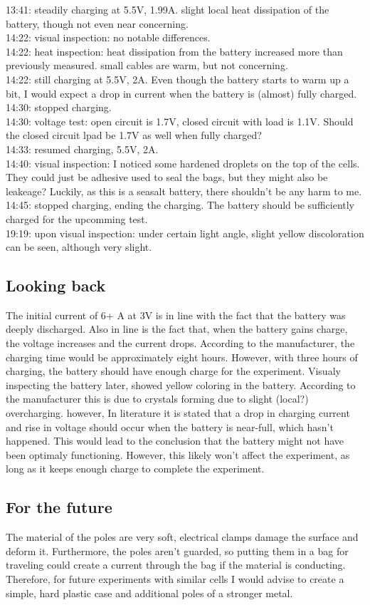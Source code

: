 13:41: steadily charging at 5.5V, 1.99A. slight local heat dissipation of the battery, though not even near concerning.\\
14:22: visual inspection: no notable differences.\\
14:22: heat inspection: heat dissipation from the battery increased more than previously measured. small cables are warm, but not concerning.\\
14:22: still charging at 5.5V, 2A. Even though the battery starts to warm up a bit, I would expect a drop in current when the battery is (almost) fully charged.\\
14:30: stopped charging.\\
14:30: voltage test: open circuit is 1.7V, closed circuit with load is 1.1V. Should the closed circuit lpad be 1.7V as well when fully charged?\\
14:33: resumed charging, 5.5V, 2A.\\
14:40: visual inspection: I noticed some hardened droplets on the top of the cells. They could just be adhesive used to seal the bags, but they might also be leakeage? Luckily, as this is a seasalt battery, there shouldn't be any harm to me.\\
14:45: stopped charging, ending the charging. The battery should be sufficiently charged for the upcomming test. \\
19:19: upon visual inspection: under certain light angle, slight yellow discoloration can be seen, although very slight. 


\subsection{Looking back}
The initial current of 6+ A at 3V is in line with the fact that the battery was deeply discharged. Also in line is the fact that, when the battery gains charge, the voltage increases and the current drops. According to the manufacturer, the charging time would be approximately eight hours. However, with three hours of charging, the battery should have enough charge for the experiment. Visualy inspecting the battery later, showed yellow coloring in the battery. According to the manufacturer this is due to crystals forming due to slight (local?) overcharging. however, In literature it is stated that a drop in charging current and rise in voltage should occur when the battery is near-full, which hasn't happened. This would lead to the conclusion that the battery might not have been optimaly functioning. However, this likely won't affect the experiment, as long as it keeps enough charge to complete the experiment.

\subsection{For the future}
The material of the poles are very soft, electrical clamps damage the surface and deform it. Furthermore, the poles aren't guarded, so putting them in a bag for traveling could create a current through the bag if the material is conducting. Therefore, for future experiments with similar cells I would advise to create a simple, hard plastic case and additional poles of a stronger metal.

